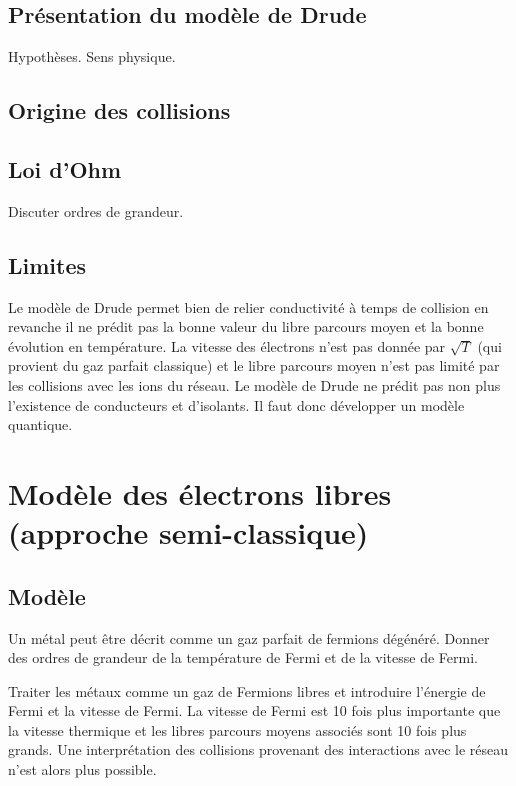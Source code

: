 \documentclass[11pt]{report}
\numberwithin{figure}{section}
\numberwithin{equation}{section}
\numberwithin{table}{section}
\newcommand{\1}{\boldsymbol{1}}
\begin{document}
\subsection{Présentation du modèle de Drude}

Hypothèses. Sens physique.

\subsection{Origine des collisions}

\subsection{Loi d'Ohm}

Discuter ordres de grandeur.

\subsection{Limites}

Le modèle de Drude permet bien de relier
conductivité à temps de collision en revanche il ne prédit pas la bonne valeur du libre parcours moyen et la bonne évolution en température. La vitesse des électrons n'est pas donnée par $\sqrt{T}$ (qui provient du gaz parfait classique) et le libre parcours moyen n'est pas limité par les collisions
avec les ions du réseau. Le modèle de Drude ne prédit pas non plus l'existence de conducteurs et d'isolants. Il faut donc développer un modèle quantique.

\section{Modèle des électrons libres (approche semi-classique)}

\subsection{Modèle}

Un métal peut être décrit comme un gaz parfait de fermions dégénéré. Donner des ordres de grandeur de la température de Fermi et de la vitesse de Fermi.


Traiter les métaux comme un gaz de Fermions libres et introduire l'énergie de Fermi et la vitesse de Fermi. La vitesse de Fermi est 10 fois plus importante que la vitesse
thermique et les libres parcours moyens associés sont 10 fois plus grands. Une interprétation des collisions provenant des interactions avec le réseau n'est alors plus possible.
\end{document}
